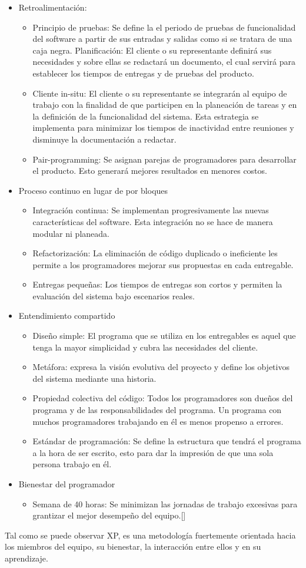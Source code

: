 \begin{itemize}
	\item Retroalimentación:
		\begin{itemize}
			\item Principio de pruebas: Se define la el periodo de pruebas de funcionalidad del software a partir de sus entradas y salidas como si se tratara de una caja negra.
Planificación: El cliente o su representante definirá sus necesidades y sobre ellas se redactará un documento, el cual servirá para establecer los tiempos de entregas y de pruebas del producto.
			\item Cliente in-situ: El cliente o su representante se integrarán al equipo de trabajo con la finalidad de que participen en la planeación de tareas y en la definición de la funcionalidad del sistema. Esta estrategia se implementa para minimizar los tiempos de inactividad entre reuniones y disminuye la documentación a redactar.
			\item Pair-programming: Se asignan parejas de programadores para desarrollar el producto. Esto generará mejores resultados en menores costos.
		\end{itemize}
	\item Proceso continuo en lugar de por bloques
		\begin{itemize}
			\item Integración continua: Se implementan progresivamente las nuevas características del software. Esta integración no se hace de manera modular ni planeada.
			\item Refactorización: La eliminación de código duplicado o ineficiente les permite a los programadores mejorar sus propuestas en cada entregable.
			\item Entregas pequeñas: Los tiempos de entregas son cortos y permiten la evaluación del sistema bajo escenarios reales.
		\end{itemize}
	\item Entendimiento compartido
		\begin{itemize}
			\item Diseño simple: El programa que se utiliza en los entregables es aquel que tenga la mayor simplicidad y cubra las necesidades del cliente.
			\item Metáfora: expresa la visión evolutiva del proyecto y define los objetivos del sistema mediante una historia.
			\item Propiedad colectiva del código: Todos los programadores son dueños del programa y de las responsabilidades del programa. Un programa con muchos programadores trabajando en él es menos propenso a errores. 
			\item Estándar de programación: Se define la estructura que tendrá el programa a la hora de ser escrito, esto para dar la impresión de que una sola persona trabajo en él.
		\end{itemize}
	\item Bienestar del programador
		\begin{itemize}
			\item Semana de 40 horas: Se minimizan las jornadas de trabajo excesivas para grantizar el mejor desempeño del equipo.[]
		\end{itemize}
\end{itemize}
Tal como se puede observar XP, es una metodología fuertemente orientada hacia los miembros del equipo, su bienestar, la interacción entre ellos y en su aprendizaje.